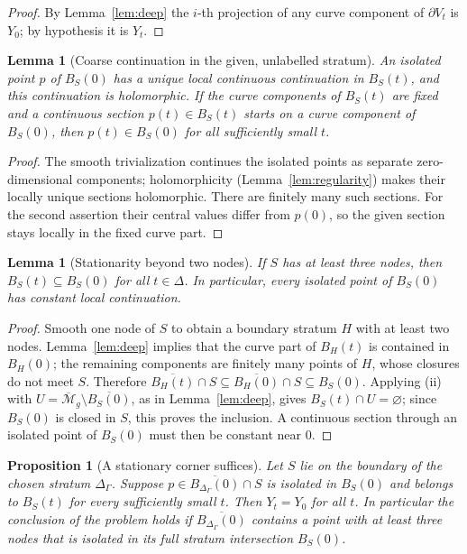 \documentclass[11pt]{article}
\newcommand{\M}{\mathcal M}
\newcommand{\cl}[1]{\overline{#1}}
\newtheorem{lemma}[theorem]{Lemma}
\newtheorem{proposition}[theorem]{Proposition}
\theoremstyle{remark}
\begin{document}
\begin{proof}
By Lemma~\ref{lem:deep} the \(i\)-th projection of any curve
component of \(\partial V_t\) is \(Y_0\); by hypothesis it is \(Y_t\).
\end{proof}

\begin{lemma}[Coarse continuation in the given, unlabelled stratum]
\label{lem:isolated}
An isolated point \(p\) of \(B_S(0)\) has a unique local continuous
continuation in \(B_S(t)\), and this continuation is holomorphic.
If the curve components of \(B_S(t)\) are fixed and a continuous
section \(p(t)\in B_S(t)\) starts on a curve component of \(B_S(0)\),
then \(p(t)\in B_S(0)\) for all sufficiently small \(t\).
\end{lemma}

\begin{proof}
The smooth trivialization continues the isolated points as
separate zero-dimensional components; holomorphicity
(Lemma~\ref{lem:regularity}) makes their locally unique sections
holomorphic. There are finitely many such sections. For the second
assertion their central values differ from \(p(0)\), so the given
section stays locally in the fixed curve part.
\end{proof}

\begin{lemma}[Stationarity beyond two nodes]\label{lem:deep-points}
If \(S\) has at least three nodes, then
\(B_S(t)\subseteq B_S(0)\) for all \(t\in\Delta\).
In particular, every isolated point of \(B_S(0)\) has constant
local continuation.
\end{lemma}

\begin{proof}
Smooth one node of \(S\) to obtain a boundary stratum \(H\) with at
least two nodes. Lemma~\ref{lem:deep} implies that the curve part
of \(B_H(t)\) is contained in \(B_H(0)\); the remaining components
are finitely many points of \(H\), whose closures do not meet \(S\).
Therefore
\(\cl{B_H(t)}\cap S\subseteq\cl{B_H(0)}\cap S\subseteq B_S(0)\).
Applying (ii) with \(U=\cl{\M}_g\setminus\cl{B_S(0)}\), as in
Lemma~\ref{lem:deep}, gives \(B_S(t)\cap U=\varnothing\); since
\(B_S(0)\) is closed in \(S\), this proves the inclusion.
A continuous section through an isolated point of \(B_S(0)\)
must then be constant near \(0\).
\end{proof}

\begin{proposition}[A stationary corner suffices]\label{prop:fixed-cusp}
Let \(S\) lie on the boundary of the chosen stratum
\(\Delta_\Gamma\). Suppose
\(p\in\cl{B_{\Delta_\Gamma}(0)}\cap S\)
is isolated in \(B_S(0)\) and belongs to \(B_S(t)\) for every
sufficiently small \(t\). Then \(Y_t=Y_0\) for all \(t\). In
particular the conclusion of the problem holds if
\(\cl{B_{\Delta_\Gamma}(0)}\) contains a point with at least three
nodes that is isolated in its full stratum intersection \(B_S(0)\).
\end{proposition}
\end{document}
